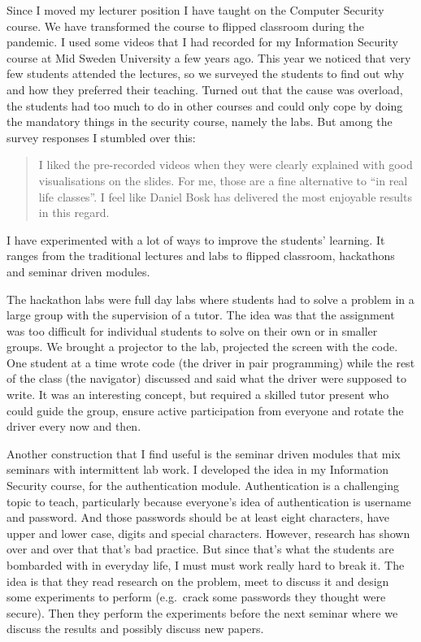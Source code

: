 Since I moved my lecturer position I have taught on the Computer Security 
course.
We have transformed the course to flipped classroom during the pandemic.
I used some videos that I had recorded for my Information Security course at 
Mid Sweden University a few years ago.
This year we noticed that very few students attended the lectures, so we 
surveyed the students to find out why and how they preferred their teaching.
Turned out that the cause was overload, the students had too much to do in 
other courses and could only cope by doing the mandatory things in the security 
course, namely the labs.
But among the survey responses I stumbled over this:
\begin{quote}
  I liked the pre-recorded videos when they were clearly explained with good 
  visualisations on the slides. For me, those are a fine alternative to 
  \enquote{in real life classes}. I feel like Daniel Bosk has delivered the 
    most enjoyable results in this regard.
\end{quote}

I have experimented with a lot of ways to improve the students' learning.
It ranges from the traditional lectures and labs to flipped classroom, 
hackathons and seminar driven modules.

The hackathon labs were full day labs where students had to solve a problem in 
a large group with the supervision of a tutor.
The idea was that the assignment was too difficult for individual students to 
solve on their own or in smaller groups.
We brought a projector to the lab, projected the screen with the code.
One student at a time wrote code (the driver in pair programming) while the 
rest of the class (the navigator) discussed and said what the driver were 
supposed to write.
It was an interesting concept, but required a skilled tutor present who could 
guide the group, ensure active participation from everyone and rotate the 
driver every now and then.


Another construction that I find useful is the seminar driven modules that mix 
seminars with intermittent lab work.
I developed the idea in my Information Security course, for the authentication 
module.
Authentication is a challenging topic to teach, particularly because everyone's 
idea of authentication is username and password.
And those passwords should be at least eight characters, have upper and lower 
case, digits and special characters.
However, research has shown over and over that that's bad practice.
But since that's what the students are bombarded with in everyday life, I must 
must work really hard to break it.
The idea is that they read research on the problem, meet to discuss it and 
design some experiments to perform (e.g.~crack some passwords they thought were 
secure).
Then they perform the experiments before the next seminar where we discuss the 
results and possibly discuss new papers.


